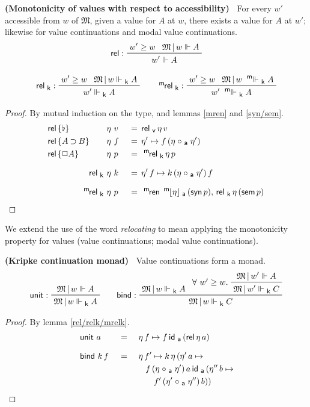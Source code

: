 \documentclass{entcs}
\numberwithin{equation}{thm}
\newcommand{\tsf}[1]{\textsf{\upshape{#1}}}
\newcommand{\stsf}[1]{\tsf{\small{#1}}}
\renewcommand{\:}{\mathrel{:}}
\newcommand{\tyrule}[1]{\prftree[l]{${#1} \:\,$}}
\let\oldforall\forall
\renewcommand{\forall}{\oldforall\,}
\newcommand{\0}{\varnothing}
\newcommand{\base}{\flat}
\newcommand{\imp}{\mathbin{\supset}}
\newcommand{\sq}{\Box}
\newcommand{\mren}{\operatorname{^{\stsf{m}\mkern-2mu}\tsf{ren}}}
\newcommand{\M}{\mathfrak{M}}
\newcommand{\ida}{\operatorname{\tsf{id}_{\stsf{a}}}}
\newcommand{\compa}{\mathrel{\circ_{\stsf{a}}}}
\newcommand{\relv}{\operatorname{\tsf{rel}_{\stsf{v}}}}
\newcommand{\mpeeka}[1]{\mathopen{^{\stsf{m}\mkern-3mu}\lfloor}{#1}\mathclose{\rfloor_{\mkern-2mu\stsf{a}}}}
\newcommand{\ee}{\mathrel{\Vdash}}
\newcommand{\eek}{\mathrel{\Vdash_{\stsf{k}}}}
\newcommand{\meek}{\mathrel{^{\stsf{m}\mkern-6mu}\Vdash_{\stsf{k}}}}
\newcommand{\syn}{\operatorname{\tsf{syn}}}
\newcommand{\sem}{\operatorname{\tsf{sem}}}
\newcommand{\rel}{\operatorname{\tsf{rel}}}
\newcommand{\relk}{\operatorname{\tsf{rel}_{\stsf{k}}}}
\newcommand{\mrelk}{\operatorname{^{\stsf{m}\mkern-2mu}\tsf{rel}_{\stsf{k}}}}
\newcommand{\unit}{\operatorname{\tsf{unit}}}
\newcommand{\bind}{\operatorname{\tsf{bind}}}
\begin{document}
\begin{lemma}
  \normalshape
  \textbf{(Monotonicity of values with respect to accessibility)\ }
  \label{rel/relk/mrelk}
  For every $w'$ accessible from $w$ of $\M$, given a value for $A$ at $w$, there exists a value for $A$ at $w'$; likewise for value continuations and modal value continuations.
  \begin{gather*}
    \tyrule{\rel}{w' \ge w}{\M\,|\, w \ee A}{w' \ee A}\\[0.5\baselineskip]
    \tyrule{\relk}{w' \ge w}{\M\,|\, w \eek A}{w' \eek A}\qquad
    \tyrule{\mrelk}{w' \ge w}{\M\,|\, w \meek A}{w' \meek A}
  \end{gather*}
  \itshape
  \begin{proof}
    \normalshape
    By mutual induction on the type, and lemmas \ref{mren} and \ref{syn/sem}.
    \begin{alignat*}{3}
      & \rlap{$\rel\, \{\base\}$}     &\,\eta\, &\,v \,&&=\, \relv \eta\, v\\
      & \rlap{$\rel\, \{A \imp B\}$}  &\,\eta\, &\,f \,&&=\, \eta' \mapsto f\, (\eta \compa \eta')\\
      & \rlap{$\rel\, \{\sq A\}$}     &\,\eta\, &\,p \,&&=\, \mrelk \eta\, p\\[0.5\baselineskip]
      && \qquad\quad \relk             \,\eta\, &\,k \,&&=\, \eta'\, f \mapsto k\, (\eta \compa \eta')\, f\\[0.5\baselineskip]
      && \qquad\quad \mrelk            \,\eta\, &\,p \,&&=\, \mren\, \mpeeka{\eta}\, (\syn p),\, \relk \eta\, (\sem p)
    \end{alignat*}
  \end{proof}
\end{lemma}

\noindent
We extend the use of the word \emph{relocating} to mean applying the monotonicity property for values (value continuations; modal value continuations).

\begin{lemma}
  \normalshape
  \textbf{(Kripke continuation monad)\ }
  \label{unit/bind}
  Value continuations form a monad.
  \begin{gather*}
    \tyrule{\unit}{\M\,|\,w \ee A}{\M\,|\,w \eek A}\qquad
    \tyrule{\bind}{\M\,|\,w \eek A}{\raisebox{8pt}{$\forall w' \ge w.\ $} \prftree{\M\,|\, w' \ee A}{\M\,|\, w' \eek C}}{\M\,|\,w \eek C}
  \end{gather*}
  \itshape
  \begin{proof}
    \normalshape
    By lemma \ref{rel/relk/mrelk}.
    \begin{alignat*}{3}
      & \unit\,a      \,&&=\, &&\,\eta\, f \mapsto f \ida\, (\rel \eta\, a)\\[0.5\baselineskip]
      & \bind\, k\, f \,&&=\, &&\,\eta\, f' \mapsto k\, \eta\, (\eta'\, a \mapsto\\
      &                 &&    &&\quad f\, (\eta \compa \eta')\, a \ida\, (\eta''\, b \mapsto\\
      &                 &&    &&\quad\quad f'\, (\eta' \compa \eta'')\, b))
    \end{alignat*}
  \end{proof}
\end{lemma}
\end{document}
